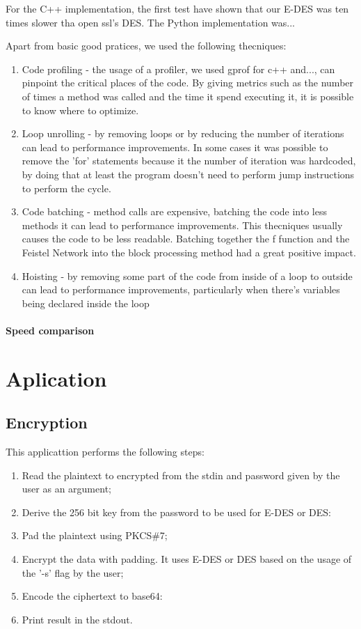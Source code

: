 \documentclass{article} %
\begin{document}
For the C++ implementation, the first test have shown that our E-DES was ten times slower tha open ssl's DES. The Python implementation was...

Apart from basic good pratices, we used the following thecniques:
\begin{enumerate}
  \item Code profiling - the usage of a profiler, we used gprof for c++ and..., can pinpoint the critical places of the code. By giving metrics such as the number of 
  times a method was called and the time it spend executing it, it is possible to know where to optimize.
  \item Loop unrolling - by removing loops or by reducing the number of iterations can lead to performance improvements. In some cases it was possible to remove the 'for'
  statements because it the number of iteration was hardcoded, by doing that at least the program doesn't need to perform jump instructions to perform the cycle.
  \item Code batching - method calls are expensive, batching the code into less methods it can lead to performance improvements. This thecniques usually causes the code 
  to be less readable. Batching together the f function and the Feistel Network into the block processing method had a great positive impact.
  \item Hoisting - by removing some part of the code from inside of a loop to outside can lead to performance improvements, particularly when there's variables being
  declared inside the loop
\end{enumerate}

\paragraph{Speed comparison}


\section {Aplication}
\subsection{Encryption}
This applicattion performs the following steps:
\begin{enumerate}
  \item Read the plaintext to encrypted from the stdin and password given by the user as an argument;
  \item Derive the 256 bit key from the password to be used for E-DES or DES:
  \item Pad the plaintext using PKCS\#7;
  \item Encrypt the data with padding. It uses E-DES or DES based on the usage of the '-s' flag by the user;
  \item Encode the ciphertext to base64:
  \item Print result in the stdout.
\end{enumerate}
\end{document}

